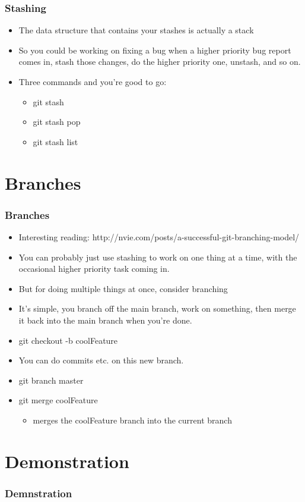 \documentclass{beamer}
\begin{document}
\begin{frame}
\frametitle{Stashing}
\begin{itemize}
\pause
\item The data structure that contains your stashes is actually a stack
\pause
\item So you could be working on fixing a bug when a higher priority bug report
comes in, stash those changes, do the higher priority one, unstash, and so on.
\pause
\item Three commands and you're good to go:
	\begin{itemize}
	\pause
	\item git stash
	\pause
	\item git stash pop
	\pause
	\item git stash list
	\end{itemize}
\end{itemize}
\end{frame}


\section{Branches}
\begin{frame}
\frametitle{Branches}
\begin{itemize}
\pause
\item Interesting reading: http://nvie.com/posts/a-successful-git-branching-model/
\pause
\item You can probably just use stashing to work on one thing at a time, with
the occasional higher priority task coming in.
\pause
\item But for doing multiple things at once, consider branching
\pause
\item It's simple, you branch off the main branch, work on something, then merge
it back into the main branch when you're done.
\pause
\item git checkout -b coolFeature
\pause
\item You can do commits etc. on this new branch.
\pause
\item git branch master
\pause
\item git merge coolFeature
	\begin{itemize}
	\pause
	\item merges the coolFeature branch into the current branch
	\end{itemize}
\end{itemize}
\end{frame}


\section{Demonstration}
\begin{frame}
\frametitle{Demnstration}
\end{frame}
\end{document}

